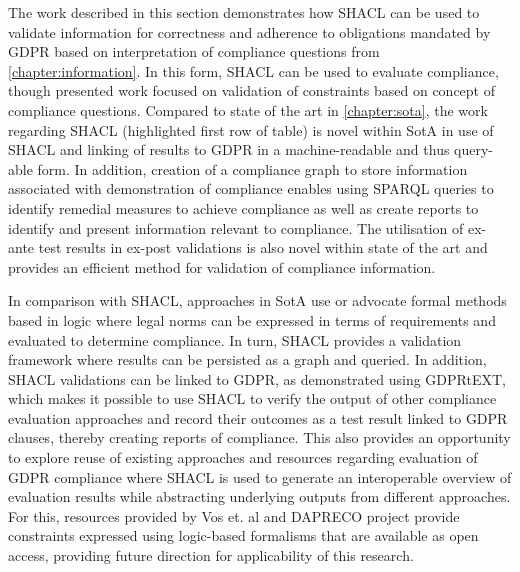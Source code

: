 The work described in this section demonstrates how SHACL can be used to validate information for correctness and adherence to obligations mandated by GDPR based on interpretation of compliance questions from \autoref{chapter:information}. In this form, SHACL can be used to evaluate compliance, though presented work focused on validation of constraints based on concept of compliance questions.
Compared to state of the art in \autoref{chapter:sota}, the work regarding SHACL (highlighted first row of table) is novel within SotA in use of SHACL and linking of results to GDPR in a machine-readable and thus query-able form.
In addition, creation of a compliance graph to store information associated with demonstration of compliance enables using SPARQL queries to identify remedial measures to achieve compliance as well as create reports to identify and present information relevant to compliance.
The utilisation of ex-ante test results in ex-post validations is also novel within state of the art and provides an efficient method for validation of compliance information.

In comparison with SHACL, approaches in SotA use or advocate formal methods based in logic where legal norms can be expressed in terms of requirements and evaluated to determine compliance.
In turn, SHACL provides a validation framework where results can be persisted as a graph and queried. In addition, SHACL validations can be linked to GDPR, as demonstrated using GDPRtEXT, which makes it possible to use SHACL to verify the output of other compliance evaluation approaches and record their outcomes as a test result linked to GDPR clauses, thereby creating reports  of compliance.
This also provides an opportunity to explore reuse of existing approaches and resources regarding evaluation of GDPR compliance where SHACL is used to generate an interoperable overview of evaluation results while abstracting underlying outputs from different approaches.
For this, resources provided by Vos et. al \cite{vos_odrl_2019} and DAPRECO project \cite{bartolini_agile_2019} provide constraints expressed using logic-based formalisms that are available as open access, providing future direction for applicability of this research.


